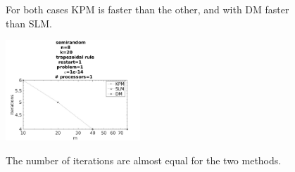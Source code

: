 \begin{figure}[H]
\begin{subfigure}[b]{0.45\textwidth}
                \caption{  }
                \label{fig:sresulttimek}
        \end{subfigure}
        \caption{ For both cases KPM is faster than the other, and with DM faster than SLM.  }
        \label{fig:sresulttime}
\end{figure}



\begin{figure}[H]
        \centering

                \includegraphics[width=0.45\textwidth]{../MATLAB/fig/sresultiter.jpg}
        \label{fig:sresultiter}
        \caption{The number of iterations are almost equal for the two methods.}
\end{figure}

